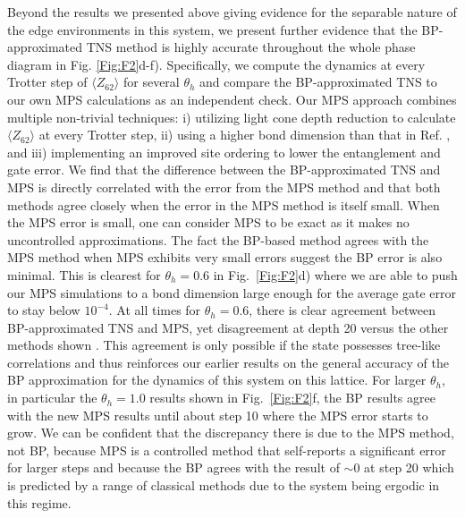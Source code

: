 \documentclass[%
 superscriptaddress,
 amsmath,amssymb,
 prx, nofootinbib,
 twocolumn
]{revtex4-2}
\begin{document}
Beyond the results we presented above giving evidence for the separable nature of the edge environments in this system, we present further evidence that the  BP-approximated TNS method is highly accurate throughout the whole phase diagram in Fig. \ref{Fig:F2}d-f).
Specifically, we compute the dynamics at every Trotter step of $\langle Z_{62} \rangle$ for several $\theta_{h}$ and compare the BP-approximated TNS to our own MPS calculations as an independent check. Our MPS approach combines multiple non-trivial techniques:  i) utilizing light cone depth reduction to calculate $\langle Z_{62} \rangle$ at every Trotter step, ii) using a higher bond dimension than that in Ref. \cite{kim2023}, and iii) implementing an improved site ordering to lower the entanglement and gate error.
We find that the difference between the BP-approximated TNS and MPS is directly correlated with the error from the MPS method and that both methods agree closely when the error in the MPS method is itself small. 
When the MPS error is small, one can consider MPS to be exact as it makes no uncontrolled approximations.
The fact the BP-based method agrees with the MPS method when MPS exhibits very small errors suggest the BP error is also minimal. 
This is clearest for $\theta_{h} = 0.6$ in Fig.~\ref{Fig:F2}d) where we are able to push our MPS simulations to a bond dimension large enough for the average gate error to stay below $10^{-4}$. At all times for $\theta_{h} = 0.6$, there is clear agreement between BP-approximated TNS and MPS, yet disagreement at depth 20 versus the other methods shown \cite{Zalatel2023, begušić2023, Chan2023, kechedzhi2023, Liao2023}. This agreement is only possible if the state possesses tree-like correlations and thus reinforces our earlier results on the general accuracy of the BP approximation for the dynamics of this system on this lattice.
For larger $\theta_h$, in particular the $\theta_h=1.0$ results shown in Fig.~\ref{Fig:F2}f, the BP results agree with the new MPS results until about step 10 where the MPS error starts to grow. We can be confident that the discrepancy there is due to the MPS method, not BP, because MPS is a controlled method that self-reports a significant error for larger steps and because the BP agrees with the result of $\sim 0$ at step 20 which is predicted by a range of classical methods \cite{Liao2023, Zalatel2023, kechedzhi2023, begušić2023, Chan2023} due to the system being ergodic in this regime.
\end{document}
